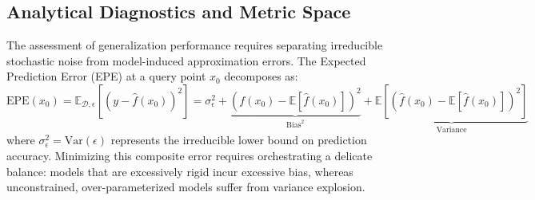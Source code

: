 \subsection{Analytical Diagnostics and Metric Space}
The assessment of generalization performance requires separating irreducible stochastic noise from model-induced approximation errors. The Expected Prediction Error (EPE) at a query point $x_0$ decomposes as:
\begin{equation}
  \text{EPE}(x_0) = \mathbb{E}_{\mathcal{D}, \epsilon} \left[ (y - \hat{f}(x_0))^2 \right] = \sigma_\epsilon^2 + \underbrace{\left( f(x_0) - \mathbb{E}[\hat{f}(x_0)] \right)^2}_{\text{Bias}^2} + \underbrace{\mathbb{E}\left[ (\hat{f}(x_0) - \mathbb{E}[\hat{f}(x_0)])^2 \right]}_{\text{Variance}}
\end{equation}
where $\sigma_\epsilon^2 = \text{Var}(\epsilon)$ represents the irreducible lower bound on prediction accuracy. Minimizing this composite error requires orchestrating a delicate balance: models that are excessively rigid incur excessive bias, whereas unconstrained, over-parameterized models suffer from variance explosion.
